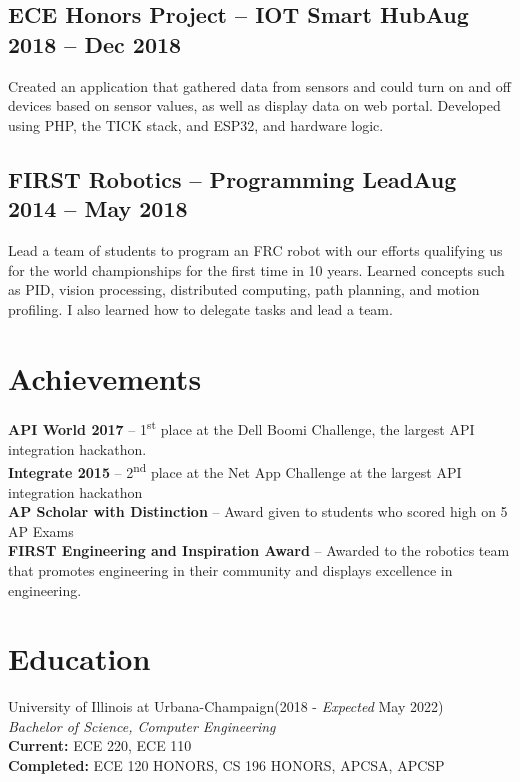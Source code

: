 \documentclass[letterpaper,12pt]{article}
\begin{document}
\subsection{ECE Honors Project -- IOT Smart Hub\null\hfill Aug 2018 -- Dec 2018}
Created an application that gathered data from sensors and could turn on and off devices based on sensor values, as well as display data on web portal.
Developed using PHP, the TICK stack, and ESP32, and hardware logic.
\vspace*{-2mm}
\subsection{FIRST Robotics -- Programming Lead\null\hfill Aug 2014 -- May 2018}
Lead a team of students to program an FRC robot with our efforts qualifying us for the world championships for the first time in 10 years.
Learned concepts such as PID, vision processing, distributed computing, path planning, and motion profiling.
I also learned how to delegate tasks and lead a team.
\vspace*{-2mm}
\section{Achievements}
{\bfseries API World 2017} -- 1\textsuperscript{st} place at the Dell Boomi Challenge, the largest API integration hackathon.\\
{\bfseries Integrate 2015} -- 2\textsuperscript{nd} place at the Net App Challenge at the largest API integration hackathon\\
{\bfseries AP Scholar with Distinction} -- Award given to students who scored high on 5 AP Exams\\
{\bfseries FIRST Engineering and Inspiration Award} -- Awarded to the robotics team that promotes engineering in their community and displays excellence in engineering.
\section{Education}
University of Illinois at Urbana-Champaign\null\hfill(2018 - \emph{Expected} May 2022)\\
\emph{Bachelor of Science, Computer Engineering}\\
{\bfseries Current: }ECE 220, ECE 110\\
{\bfseries Completed: }ECE 120 HONORS, CS 196 HONORS, APCSA, APCSP\\
\end{document}
